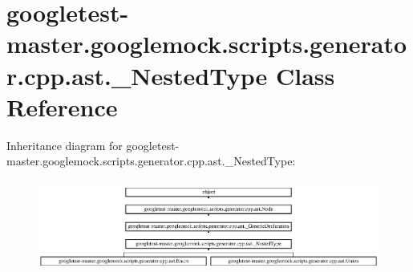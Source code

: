 \hypertarget{classgoogletest-master_1_1googlemock_1_1scripts_1_1generator_1_1cpp_1_1ast_1_1___nested_type}{}\section{googletest-\/master.googlemock.\+scripts.\+generator.\+cpp.\+ast.\+\_\+\+Nested\+Type Class Reference}
\label{classgoogletest-master_1_1googlemock_1_1scripts_1_1generator_1_1cpp_1_1ast_1_1___nested_type}
Inheritance diagram for googletest-\/master.googlemock.\+scripts.\+generator.\+cpp.\+ast.\+\_\+\+Nested\+Type\+:\begin{figure}[H]
\begin{center}
\leavevmode
\includegraphics[height=3.056768cm]{d9/d5c/classgoogletest-master_1_1googlemock_1_1scripts_1_1generator_1_1cpp_1_1ast_1_1___nested_type}
\end{center}
\end{figure}
